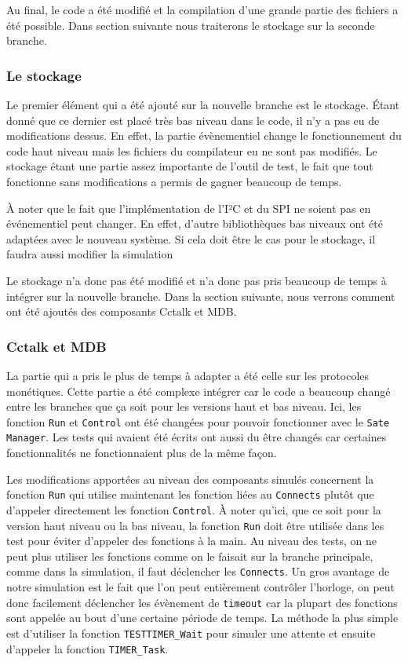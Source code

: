 \documentclass[a4paper]{article}
\begin{document}
Au final, le code a été modifié et la compilation d'une grande partie des
fichiers a été possible. Dans section suivante nous traiterons le stockage sur
la seconde branche.

\subsubsection*{Le stockage}

Le premier élément qui a été ajouté sur la nouvelle branche est le stockage.
Étant donné que ce dernier est placé très bas niveau dans le code, il n'y a pas
eu de modifications dessus. En effet, la partie évènementiel change le
fonctionnement du code haut niveau mais les fichiers du compilateur eu ne sont
pas modifiés. Le stockage étant une partie assez importante de l'outil de test,
le fait que tout fonctionne sans modifications a permis de gagner beaucoup de
temps.

À noter que le fait que l'implémentation de l'I²C et du SPI ne soient pas en
événementiel peut changer. En effet, d'autre bibliothèques bas niveaux ont
été adaptées avec le nouveau système. Si cela doit être le cas pour le stockage,
il faudra aussi modifier la simulation

Le stockage n'a donc pas été modifié et n'a donc pas pris beaucoup de temps à
intégrer sur la nouvelle branche. Dans la section suivante, nous verrons comment
ont été ajoutés des composants Cctalk et MDB.

\subsubsection*{Cctalk et MDB}

La partie qui a pris le plus de temps à adapter a été celle sur les protocoles
monétiques. Cette partie a été complexe intégrer car le code a beaucoup changé
entre les branches que ça soit pour les versions haut et bas niveau. Ici, les
fonction \verb|Run| et \verb|Control| ont été changées pour pouvoir fonctionner
avec le \verb|Sate Manager|. Les tests qui avaient été écrits ont aussi du être
changés car certaines fonctionnalités ne fonctionnaient plus de la même façon.

Les modifications apportées au niveau des composants simulés concernent la
fonction \verb|Run| qui utilise maintenant les fonction liées au \verb|Connects|
plutôt que d'appeler directement les fonction \verb|Control|. À noter qu'ici,
que ce soit pour la version haut niveau ou la bas niveau, la fonction \verb|Run|
doit être utilisée dans les test pour éviter d'appeler des fonctions à la main.
Au niveau des tests, on ne peut plus utiliser les fonctions comme on le faisait
sur la branche principale, comme dans la simulation, il faut déclencher les
\verb|Connects|. Un gros avantage de notre simulation est le fait que l'on peut
entièrement contrôler l'horloge, on peut donc facilement déclencher les
évènement de \verb|timeout| car la plupart des fonctions sont appelée au bout
d'une certaine période de temps. La méthode la plus simple est d'utiliser la
fonction \verb|TESTTIMER_Wait| pour simuler une attente et ensuite d'appeler la
fonction \verb|TIMER_Task|.
\end{document}
